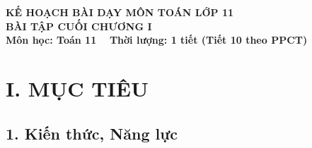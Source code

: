 \documentclass[12pt, a4paper]{article}
\begin{document}
  
  
\begin{center}  
    {\fontsize{14pt}{17pt}\selectfont \textbf{KẾ HOẠCH BÀI DẠY MÔN TOÁN LỚP 11}}\\[6pt]  
    {\fontsize{16pt}{19pt}\selectfont \textbf{BÀI TẬP CUỐI CHƯƠNG I}}\\[4pt]  
    {\fontsize{12pt}{15pt}\selectfont \textbf{Môn học: Toán 11} \ \textbar \ \textbf{Thời lượng: 1 tiết (Tiết 10 theo PPCT)}}  
\end{center}  
  
\vspace{5pt}  
  
\section*{I. MỤC TIÊU}  
  
\subsection*{1. Kiến thức, Năng lực}  
  
\end{document}
